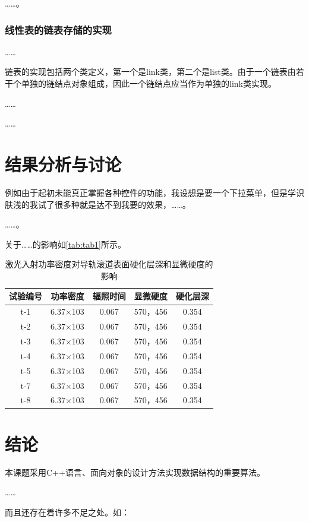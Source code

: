 \documentclass{upcthesis}
\begin{document}
……。

\subsubsection{线性表的链表存储的实现}
……

链表的实现包括两个类定义，第一个是link类，第二个是list类。由于一个链表由若干个单独的链结点对象组成，因此一个链结点应当作为单独的link类实现。\cite{RBSS}

……

……

\section{结果分析与讨论}
例如由于起初未能真正掌握各种控件的功能，我设想是要一个下拉菜单，但是学识肤浅的我试了很多种就是达不到我要的效果，……。\cite{JPKNA}

……。

关于……的影响如\autoref{tab:tab1}所示。

\begin{table}[htbp]
	\centering
	\caption{激光入射功率密度对导轨滚道表面硬化层深和显微硬度的影响}
	\begin{tabular}{ccccc}
		\toprule
		试验编号 	& 功率密度 & 辐照时间 & 显微硬度 	& 硬化层深 \\ \midrule
		t-1			&	6.37×103&	0.067	&	570，456	& 	0.354\\
		t-2			&	6.37×103&	0.067 &	570，456 &	0.354\\
		t-3			&	6.37×103&	0.067 &	570，456 &	0.354\\
		t-4			&	6.37×103&	0.067 &	570，456 &	0.354\\
		t-5			&	6.37×103&	0.067 &	570，456 &	0.354\\
		t-7			&	6.37×103&	0.067 &	570，456 &	0.354\\
		t-8			&	6.37×103&	0.067 &	570，456 &	0.354\\ \bottomrule
	\end{tabular}
	\label{tab:tab1}
\end{table} 

\section{结论}
	本课题采用C++语言、面向对象的设计方法实现数据结构的重要算法。
	
	……

	而且还存在着许多不足之处。如：

\begin{thankpage}
	\lipsum[10]
\end{thankpage}
\end{document}
